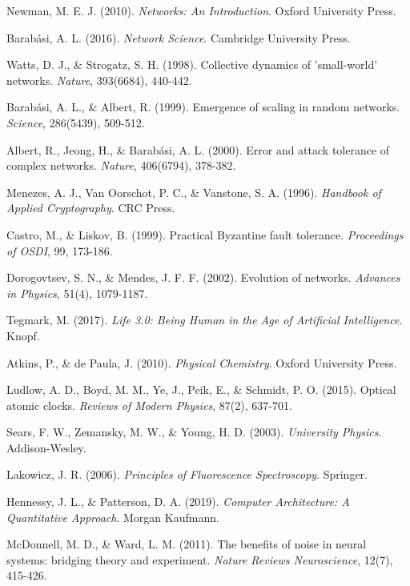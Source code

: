 \documentclass[12pt,a4paper]{article}
\begin{document}
\begin{thebibliography}{99}
Newman, M. E. J. (2010). \textit{Networks: An Introduction}. Oxford University Press.

Barabási, A. L. (2016). \textit{Network Science}. Cambridge University Press.

Watts, D. J., \& Strogatz, S. H. (1998). Collective dynamics of 'small-world' networks. \textit{Nature}, 393(6684), 440-442.

Barabási, A. L., \& Albert, R. (1999). Emergence of scaling in random networks. \textit{Science}, 286(5439), 509-512.

Albert, R., Jeong, H., \& Barabási, A. L. (2000). Error and attack tolerance of complex networks. \textit{Nature}, 406(6794), 378-382.

Menezes, A. J., Van Oorschot, P. C., \& Vanstone, S. A. (1996). \textit{Handbook of Applied Cryptography}. CRC Press.

Castro, M., \& Liskov, B. (1999). Practical Byzantine fault tolerance. \textit{Proceedings of OSDI}, 99, 173-186.

Dorogovtsev, S. N., \& Mendes, J. F. F. (2002). Evolution of networks. \textit{Advances in Physics}, 51(4), 1079-1187.

Tegmark, M. (2017). \textit{Life 3.0: Being Human in the Age of Artificial Intelligence}. Knopf.

Atkins, P., \& de Paula, J. (2010). \textit{Physical Chemistry}. Oxford University Press.

Ludlow, A. D., Boyd, M. M., Ye, J., Peik, E., \& Schmidt, P. O. (2015). Optical atomic clocks. \textit{Reviews of Modern Physics}, 87(2), 637-701.

Sears, F. W., Zemansky, M. W., \& Young, H. D. (2003). \textit{University Physics}. Addison-Wesley.

Lakowicz, J. R. (2006). \textit{Principles of Fluorescence Spectroscopy}. Springer.

Hennessy, J. L., \& Patterson, D. A. (2019). \textit{Computer Architecture: A Quantitative Approach}. Morgan Kaufmann.

McDonnell, M. D., \& Ward, L. M. (2011). The benefits of noise in neural systems: bridging theory and experiment. \textit{Nature Reviews Neuroscience}, 12(7), 415-426.


\end{thebibliography}
\end{document}
